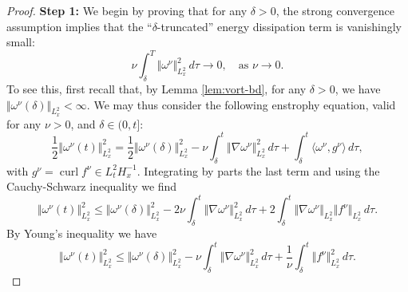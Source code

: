 \documentclass[reqno,12pt]{amsart}
\DeclareMathOperator{\curl}{curl}
\begin{document}
\begin{proof}
\textbf{Step 1:}
We begin by proving that for any $\delta > 0$, the strong convergence assumption implies that the ``$\delta$-truncated'' energy dissipation term is vanishingly small:
\[
\nu \int_\delta^T \Vert \omega^\nu \Vert^2_{L^2_x}  \, d\tau
\to 0, \quad
\text{as } \nu \to 0.
\]
To see this, first recall that, by Lemma \ref{lem:vort-bd}, for any $\delta > 0$, we have $\Vert \omega^\nu (\delta) \Vert_{L^2_x} < \infty$. We may thus consider the following enstrophy equation, valid for any $\nu > 0$, and $\delta \in (0,t]$:
\[
\frac12 \Vert \omega^\nu(t) \Vert_{L^2_x}^2
=
\frac12 \Vert \omega^\nu(\delta) \Vert_{L^2_x}^2
-
\nu \int_\delta^t \Vert \nabla \omega^\nu \Vert_{L^2_x}^2 \, d\tau
+ \int_{\delta}^t \langle \omega^\nu, g^\nu \rangle \, d\tau,
\]
with  $g^\nu = \curl f^\nu \in L^2_tH^{-1}_x$. Integrating by parts the last term and using the Cauchy-Schwarz inequality we find
\[
\Vert \omega^\nu(t) \Vert_{L^2_x}^2
\le
\Vert \omega^\nu(\delta) \Vert_{L^2_x}^2
-
2\nu \int_\delta^t \Vert \nabla \omega^\nu \Vert_{L^2_x}^2 \, d\tau
+ 2\int_{\delta}^t \Vert \nabla \omega^\nu \Vert_{L^2_x} \Vert f^\nu \Vert_{L^2_x} \, d\tau.\]
By Young's inequality we have
\begin{equation} \label{vortestnew}
\Vert \omega^\nu(t) \Vert_{L^2_x}^2 \le
\Vert \omega^\nu(\delta) \Vert_{L^2_x}^2
-
\nu \int_\delta^t \Vert \nabla \omega^\nu \Vert_{L^2_x}^2 \, d\tau
+ \frac{1}{\nu} \int_{\delta}^t \Vert f^\nu \Vert_{L^2_x}^2 \, d\tau.
\end{equation}


\end{proof}
\end{document}
